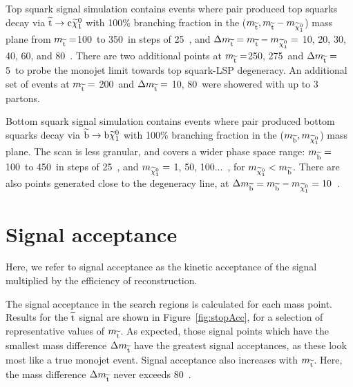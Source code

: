 Top squark signal simulation 
contains events where pair produced top squarks decay via $\widetilde{{\rm t}}\rightarrow{\rm c}\widetilde{\chi}^{0}_{1}$ with 100\% branching fraction
in the ($m_{\widetilde{{\rm t}}}, m_{\widetilde{{\rm t}}} - m_{\widetilde{\chi}^{0}_{1}}$) mass plane from $m_{\widetilde{{\rm t}}} =$100~\GeV to 350~\GeV in steps of 25~\GeV, and 
$\Delta m_{\widetilde{{\rm t}}} = m_{\widetilde{{\rm t}}} - m_{\widetilde{\chi}^{0}_{1}} = $ 10, 20, 30, 40, 60, and 80~\GeV. 
There are two additional points at  $m_{\widetilde{{\rm t}}} =$250, 275~\GeV and $\Delta m_{\widetilde{{\rm t}}} = $ 5~\GeV to probe the monojet limit towards top squark-LSP degeneracy.
An additional set of events at $m_{\widetilde{{\rm t}}} =$ 200~\GeV and $\Delta m_{\widetilde{{\rm t}}} =$ 10, 80~\GeV were showered with up to 3 partons.



Bottom squark signal simulation 
contains events where pair produced bottom squarks decay via $\widetilde{{\rm b}}\rightarrow{\rm b}\widetilde{\chi}^{0}_{1}$ with 100\% branching fraction
in the ($m_{\widetilde{{\rm b}}}, m_{\widetilde{\chi}^{0}_{1}}$) mass plane.
The scan is less granular, and covers a wider phase space range: 
$m_{\widetilde{{\rm b}}} =$100~\GeV to 450~\GeV in steps of 25~\GeV, and 
$m_{\widetilde{\chi}^{0}_{1}} = $ 1, 50, 100...~\GeV, for $m_{\widetilde{\chi}^{0}_{1}} < m_{\widetilde{{\rm b}}}$.
There are also points generated close to the degeneracy line, at 
$\Delta m_{\widetilde{{\rm b}}} = m_{\widetilde{{\rm b}}} - m_{\widetilde{\chi}^{0}_{1}} = 10$~\GeV.


\section{Signal acceptance}
\label{sec:sigAccep}

Here, we refer to signal acceptance as the kinetic acceptance of the signal multiplied by the efficiency of reconstruction. 

The signal acceptance in the search regions is calculated for each mass point. 
Results for the $\widetilde{{\rm t}}$ signal are shown in Figure~\ref{fig:stopAcc}, for a selection of representative values of $m_{\widetilde{{\rm t}}}$.
As expected, those signal points which have the smallest mass difference $\Delta m_{\widetilde{{\rm t}}}$ have the greatest signal acceptances, as these look most like a true monojet event. 
Signal acceptance also increases with $m_{\widetilde{{\rm t}}}$.
Here, the mass difference $\Delta m_{\widetilde{{\rm t}}}$ never exceeds 80~\GeV.


